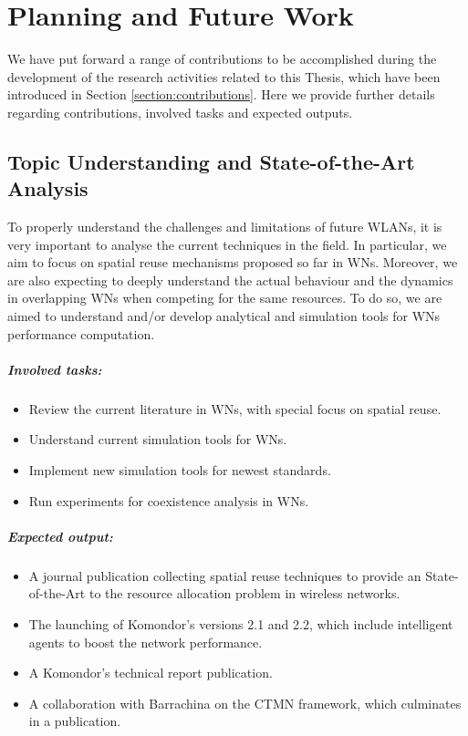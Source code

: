 \documentclass[12pt, a4paper,twoside]{tesi_upf}
\begin{document}
	\chapter{Planning and Future Work}
	\label{section:future_work}		
		We have put forward a range of contributions to be accomplished during the development of the research activities related to this Thesis, which have been introduced in Section \ref{section:contributions}. Here we provide further details regarding contributions, involved tasks and expected outputs.

		\section{Topic Understanding and State-of-the-Art Analysis}
		\label{section:contribution1}	
			To properly understand the challenges and limitations of future WLANs, it is very important to analyse the current techniques in the field. In particular, we aim to focus on spatial reuse mechanisms proposed so far in WNs. Moreover, we are also expecting to deeply understand the actual behaviour and the dynamics in overlapping WNs when competing for the same resources. To do so, we are aimed to understand and/or develop analytical and simulation tools for WNs performance computation.	
							
			\paragraph{Involved tasks:}		
			\begin{itemize}
				\item Review the current literature in WNs, with special focus on spatial reuse.
				\item Understand current simulation tools for WNs.
				\item Implement new simulation tools for newest standards.
				\item Run experiments for coexistence analysis in WNs.			
			\end{itemize}	
		
			\paragraph{Expected output:}		
			\begin{itemize}
				\item A journal publication collecting spatial reuse techniques to provide an State-of-the-Art to the resource allocation problem in wireless networks.
				\item The launching of Komondor's versions 2.1 and 2.2, which include intelligent agents to boost the network performance. 
				\item A Komondor's technical report publication.	
				\item A collaboration with Barrachina on the CTMN framework, which culminates in a publication.		
			\end{itemize}	
\end{document}
